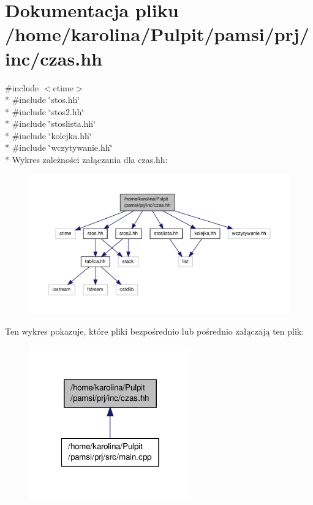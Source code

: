 \hypertarget{czas_8hh}{\section{Dokumentacja pliku /home/karolina/\-Pulpit/pamsi/prj/inc/czas.hh}
\label{czas_8hh}
}
{\ttfamily \#include $<$ctime$>$}\\*
{\ttfamily \#include \char`\"{}stos.\-hh\char`\"{}}\\*
{\ttfamily \#include \char`\"{}stos2.\-hh\char`\"{}}\\*
{\ttfamily \#include \char`\"{}stoslista.\-hh\char`\"{}}\\*
{\ttfamily \#include \char`\"{}kolejka.\-hh\char`\"{}}\\*
{\ttfamily \#include \char`\"{}wczytywanie.\-hh\char`\"{}}\\*
Wykres zależności załączania dla czas.\-hh\-:\nopagebreak
\begin{figure}[H]
\begin{center}
\leavevmode
\includegraphics[width=350pt]{czas_8hh__incl}
\end{center}
\end{figure}
Ten wykres pokazuje, które pliki bezpośrednio lub pośrednio załączają ten plik\-:\nopagebreak
\begin{figure}[H]
\begin{center}
\leavevmode
\includegraphics[width=198pt]{czas_8hh__dep__incl}
\end{center}
\end{figure}
